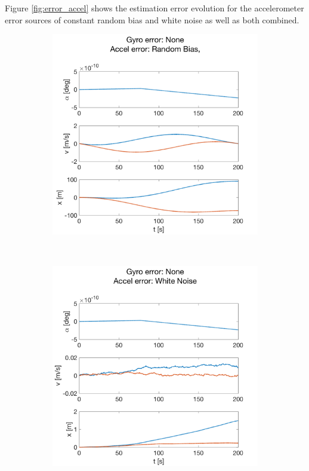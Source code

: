 \documentclass{article}
\begin{document}
Figure \ref{fig:error_accel} shows the estimation error evolution for the accelerometer
error sources of constant random bias and white noise as well as both combined.

\begin{figure}[H]
    \centering
    \begin{subfigure}[t]{0.49\textwidth}
        \centering
        \includegraphics[width=\textwidth]{fig/accel_bc}
        \caption{}
    \end{subfigure}
    ~
    \begin{subfigure}[t]{0.49\textwidth}
        \centering
        \includegraphics[width=\textwidth]{fig/accel_wn}

\end{subfigure}
\end{figure}
\end{document}
